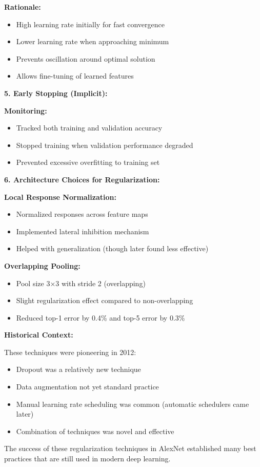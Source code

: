 \documentclass[12pt]{article}
\begin{document}
\begin{enumerate}[(a)]
{    \textbf{Rationale:}
    \begin{itemize}
        \item High learning rate initially for fast convergence
        \item Lower learning rate when approaching minimum
        \item Prevents oscillation around optimal solution
        \item Allows fine-tuning of learned features
    \end{itemize}
    
    \textbf{5. Early Stopping (Implicit):}
    
    \textbf{Monitoring:}
    \begin{itemize}
        \item Tracked both training and validation accuracy
        \item Stopped training when validation performance degraded
        \item Prevented excessive overfitting to training set
    \end{itemize}
    
    \textbf{6. Architecture Choices for Regularization:}
    
    \textbf{Local Response Normalization:}
    \begin{itemize}
        \item Normalized responses across feature maps
        \item Implemented lateral inhibition mechanism
        \item Helped with generalization (though later found less effective)
    \end{itemize}
    
    \textbf{Overlapping Pooling:}
    \begin{itemize}
        \item Pool size 3×3 with stride 2 (overlapping)
        \item Slight regularization effect compared to non-overlapping
        \item Reduced top-1 error by 0.4\% and top-5 error by 0.3\%
    \end{itemize}
    
    \textbf{Historical Context:}
    
    These techniques were pioneering in 2012:
    \begin{itemize}
        \item Dropout was a relatively new technique
        \item Data augmentation not yet standard practice
        \item Manual learning rate scheduling was common (automatic schedulers came later)
        \item Combination of techniques was novel and effective
    \end{itemize}
    
    The success of these regularization techniques in AlexNet established many best practices that are still used in modern deep learning.
    }
\end{enumerate}
\end{document}
